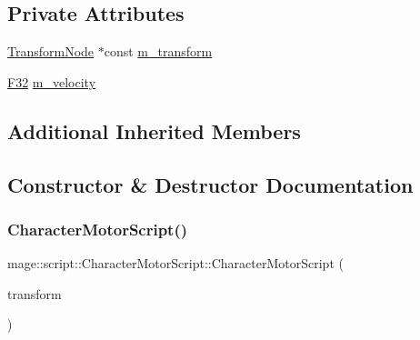 \subsection*{Private Attributes}
\begin{DoxyCompactItemize}
\item 
\hyperlink{classmage_1_1_transform_node}{Transform\+Node} $\ast$const \hyperlink{classmage_1_1script_1_1_character_motor_script_adf11fdad0fc73ef1ae829d4d781f2b0c}{m\+\_\+transform}
\item 
\hyperlink{namespacemage_aa97e833b45f06d60a0a9c4fc22ae02c0}{F32} \hyperlink{classmage_1_1script_1_1_character_motor_script_a30db45f04bc56380729af037e71ff237}{m\+\_\+velocity}
\end{DoxyCompactItemize}
\subsection*{Additional Inherited Members}


\subsection{Constructor \& Destructor Documentation}
\hypertarget{classmage_1_1script_1_1_character_motor_script_a5bc6ed6c6396056d784fb641c12c8d6d}{}\label{classmage_1_1script_1_1_character_motor_script_a5bc6ed6c6396056d784fb641c12c8d6d} 
\subsubsection{\texorpdfstring{Character\+Motor\+Script()}{CharacterMotorScript()}\hspace{0.1cm}{\footnotesize\ttfamily [1/3]}}
{\footnotesize\ttfamily mage\+::script\+::\+Character\+Motor\+Script\+::\+Character\+Motor\+Script (\begin{DoxyParamCaption}\item[{\hyperlink{classmage_1_1_transform_node}{Transform\+Node} $\ast$}]{transform }\end{DoxyParamCaption})\hspace{0.3cm}{\ttfamily [explicit]}}

\hypertarget{classmage_1_1script_1_1_character_motor_script_abfeb49ef88503f3c86788c042438d69e}{}\label{classmage_1_1script_1_1_character_motor_script_abfeb49ef88503f3c86788c042438d69e} 
